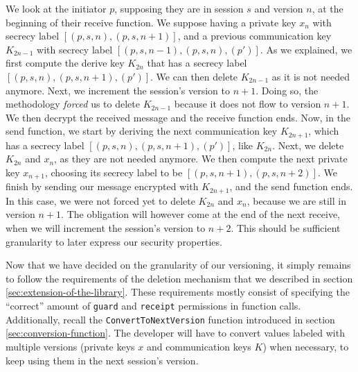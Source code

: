 We look at the initiator $p$, supposing they are in session $s$ and version $n$, at the beginning of their receive function. We suppose having a private key $x_{n}$ with secrecy label $[(p,s,n),(p,s,n+1)]$, and a previous communication key $K_{2n-1}$ with secrecy label $[(p,s,n-1),(p,s,n),(p')]$.
As we explained, we first compute the derive key $K_{2n}$ that has a secrecy label $[(p,s,n),(p,s,n+1),(p')]$.
We can then delete $K_{2n-1}$ as it is not needed anymore.
Next, we increment the session's version to $n+1$.
Doing so, the methodology \emph{forced} us to delete $K_{2n-1}$ because it does not flow to version $n+1$.
We then decrypt the received message and the receive function ends.
Now, in the send function, we start by deriving the next communication key $K_{2n+1}$, which has a secrecy label $[(p,s,n),(p,s,n+1),(p')]$, like $K_{2n}$.
Next, we delete $K_{2n}$ and $x_{n}$, as they are not needed anymore.
We then compute the next private key $x_{n+1}$, choosing its secrecy label to be $[(p,s,n+1),(p,s,n+2)]$.
We finish by sending our message encrypted with $K_{2n+1}$, and the send function ends.
In this case, we were not forced yet to delete $K_{2n}$ and $x_{n}$, because we are still in version $n+1$. The obligation will however come at the end of the next receive, when we will increment the session's version to $n+2$.
This should be sufficient granularity to later express our security properties.

Now that we have decided on the granularity of our versioning, it simply remains to follow the requirements of the deletion mechanism that we described in section \ref{sec:extension-of-the-library}.
These requirements mostly consist of specifying the “correct” amount of \texttt{guard} and \texttt{receipt} permissions in function calls. 
Additionally, recall the \texttt{ConvertToNextVersion} function introduced in section \ref{sec:conversion-function}.
The developer will have to convert values labeled with multiple versions (private keys $x$ and communication keys $K$) when necessary, to keep using them in the next session's version.

